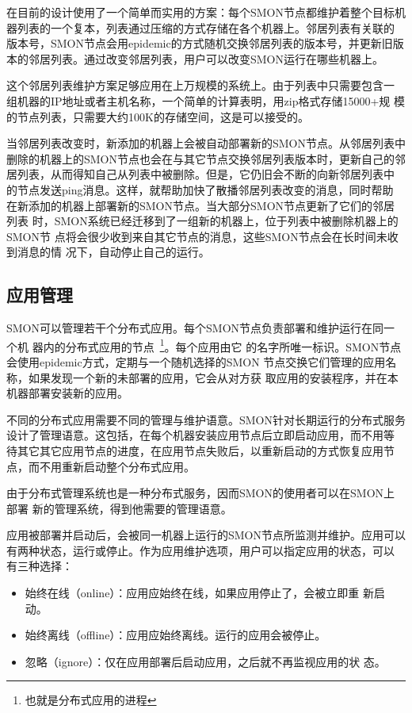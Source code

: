 在目前的设计使用了一个简单而实用的方案：每个SMON节点都维护着整个目标机
器列表的一个复本，列表通过压缩的方式存储在各个机器上。邻居列表有关联的
版本号，SMON节点会用epidemic的方式随机交换邻居列表的版本号，并更新旧版
本的邻居列表。通过改变邻居列表，用户可以改变SMON运行在哪些机器上。

这个邻居列表维护方案足够应用在上万规模的系统上。由于列表中只需要包含一
组机器的IP地址或者主机名称，一个简单的计算表明，用zip格式存储15000+规
模的节点列表，只需要大约100K的存储空间，这是可以接受的。

当邻居列表改变时，新添加的机器上会被自动部署新的SMON节点。从邻居列表中
删除的机器上的SMON节点也会在与其它节点交换邻居列表版本时，更新自己的邻
居列表，从而得知自己从列表中被删除。但是，它仍旧会不断的向新邻居列表中
的节点发送ping消息。这样，就帮助加快了散播邻居列表改变的消息，同时帮助
在新添加的机器上部署新的SMON节点。当大部分SMON节点更新了它们的邻居列表
时，SMON系统已经迁移到了一组新的机器上，位于列表中被删除机器上的SMON节
点将会很少收到来自其它节点的消息，这些SMON节点会在长时间未收到消息的情
况下，自动停止自己的运行。


\subsection{应用管理}

SMON可以管理若干个分布式应用。每个SMON节点负责部署和维护运行在同一个机
器内的分布式应用的节点~\footnote{也就是分布式应用的进程}。每个应用由它
的名字所唯一标识。SMON节点会使用epidemic方式，定期与一个随机选择的SMON
节点交换它们管理的应用名称，如果发现一个新的未部署的应用，它会从对方获
取应用的安装程序，并在本机器部署安装新的应用。

不同的分布式应用需要不同的管理与维护语意。SMON针对长期运行的分布式服务
设计了管理语意。这包括，在每个机器安装应用节点后立即启动应用，而不用等
待其它其它应用节点的进度，在应用节点失败后，以重新启动的方式恢复应用节
点，而不用重新启动整个分布式应用。

由于分布式管理系统也是一种分布式服务，因而SMON的使用者可以在SMON上部署
新的管理系统，得到他需要的管理语意。

应用被部署并启动后，会被同一机器上运行的SMON节点所监测并维护。应用可以
有两种状态，运行或停止。作为应用维护选项，用户可以指定应用的状态，可以
有三种选择：

\begin{itemize}
  \item 始终在线（online）：应用应始终在线，如果应用停止了，会被立即重
  新启动。

  \item 始终离线（offline）：应用应始终离线。运行的应用会被停止。

  \item 忽略（ignore）：仅在应用部署后启动应用，之后就不再监视应用的状
  态。
\end{itemize}

